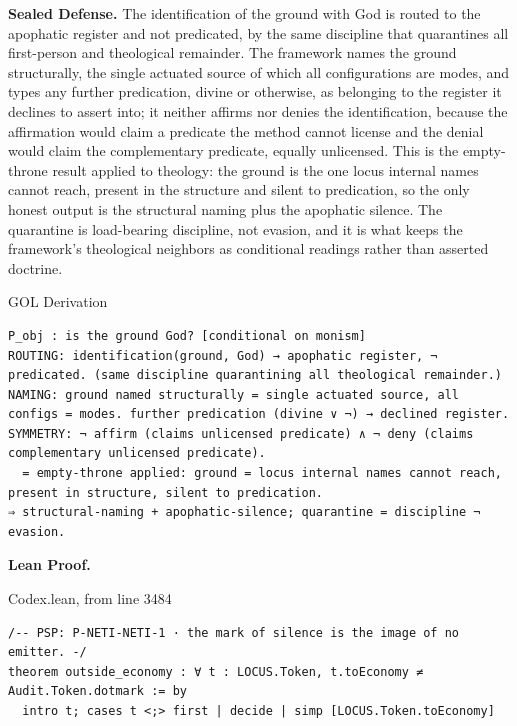 \documentclass[10pt,twocolumn]{article}
\begin{document}
\textbf{Sealed Defense.} The identification of the ground with God is
routed to the apophatic register and not predicated, by the same
discipline that quarantines all first-person and theological remainder.
The framework names the ground structurally, the single actuated source
of which all configurations are modes, and types any further
predication, divine or otherwise, as belonging to the register it
declines to assert into; it neither affirms nor denies the
identification, because the affirmation would claim a predicate the
method cannot license and the denial would claim the complementary
predicate, equally unlicensed. This is the empty-throne result applied
to theology: the ground is the one locus internal names cannot reach,
present in the structure and silent to predication, so the only honest
output is the structural naming plus the apophatic silence. The
quarantine is load-bearing discipline, not evasion, and it is what keeps
the framework's theological neighbors as conditional readings rather
than asserted doctrine.

\begin{golbox}{GOL Derivation}
\begin{lstlisting}[style=golv]
P_obj : is the ground God? [conditional on monism]
ROUTING: identification(ground, God) → apophatic register, ¬ predicated. (same discipline quarantining all theological remainder.)
NAMING: ground named structurally = single actuated source, all configs = modes. further predication (divine ∨ ¬) → declined register.
SYMMETRY: ¬ affirm (claims unlicensed predicate) ∧ ¬ deny (claims complementary unlicensed predicate).
  = empty-throne applied: ground = locus internal names cannot reach, present in structure, silent to predication.
⇒ structural-naming + apophatic-silence; quarantine = discipline ¬ evasion.
\end{lstlisting}
\end{golbox}

\textbf{Lean Proof.}

\begin{leanexcerpt}{Codex.lean, from line 3484}
\begin{lstlisting}[style=leanx,firstnumber=3484]
/-- PSP: P-NETI-NETI-1 · the mark of silence is the image of no emitter. -/
theorem outside_economy : ∀ t : LOCUS.Token, t.toEconomy ≠ Audit.Token.dotmark := by
  intro t; cases t <;> first | decide | simp [LOCUS.Token.toEconomy]
\end{lstlisting}
\end{leanexcerpt}
\end{document}

